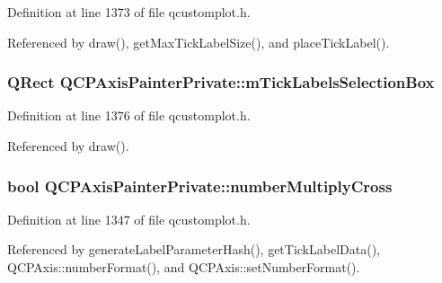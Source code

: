 Definition at line 1373 of file qcustomplot.\+h.



Referenced by draw(), get\+Max\+Tick\+Label\+Size(), and place\+Tick\+Label().

\hypertarget{class_q_c_p_axis_painter_private_a0adaf5f1d89be0f32dc4a904d157e5a9}{}
\subsubsection[{m\+Tick\+Labels\+Selection\+Box}]{\setlength{\rightskip}{0pt plus 5cm}Q\+Rect Q\+C\+P\+Axis\+Painter\+Private\+::m\+Tick\+Labels\+Selection\+Box\hspace{0.3cm}{\ttfamily [protected]}}\label{class_q_c_p_axis_painter_private_a0adaf5f1d89be0f32dc4a904d157e5a9}


Definition at line 1376 of file qcustomplot.\+h.



Referenced by draw().

\hypertarget{class_q_c_p_axis_painter_private_a0deb7524009140f00a774dfd286d002c}{}
\subsubsection[{number\+Multiply\+Cross}]{\setlength{\rightskip}{0pt plus 5cm}bool Q\+C\+P\+Axis\+Painter\+Private\+::number\+Multiply\+Cross}\label{class_q_c_p_axis_painter_private_a0deb7524009140f00a774dfd286d002c}


Definition at line 1347 of file qcustomplot.\+h.



Referenced by generate\+Label\+Parameter\+Hash(), get\+Tick\+Label\+Data(), Q\+C\+P\+Axis\+::number\+Format(), and Q\+C\+P\+Axis\+::set\+Number\+Format().

\hypertarget{class_q_c_p_axis_painter_private_aea226a1e39357d71f66d85093e30a830}{}
